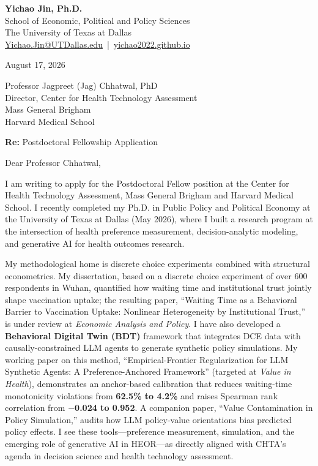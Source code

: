 \documentclass[11pt]{article}
\begin{document}
\enlargethispage{1.5\baselineskip}

\begin{flushleft}
\textbf{Yichao Jin, Ph.D.}\\
School of Economic, Political and Policy Sciences\\
The University of Texas at Dallas\\
\href{mailto:Yichao.Jin@UTDallas.edu}{Yichao.Jin@UTDallas.edu} \,|\, \href{https://yichao2022.github.io}{yichao2022.github.io}
\end{flushleft}

\vspace{14pt}

August 17, 2026

\vspace{14pt}

Professor Jagpreet (Jag) Chhatwal, PhD\\
Director, Center for Health Technology Assessment\\
Mass General Brigham\\
Harvard Medical School

\vspace{14pt}

\textbf{Re:} Postdoctoral Fellowship Application

\vspace{14pt}

Dear Professor Chhatwal,

I am writing to apply for the Postdoctoral Fellow position at the Center for Health Technology Assessment, Mass General Brigham and Harvard Medical School. I recently completed my Ph.D. in Public Policy and Political Economy at the University of Texas at Dallas (May 2026), where I built a research program at the intersection of health preference measurement, decision-analytic modeling, and generative AI for health outcomes research.

My methodological home is discrete choice experiments combined with structural econometrics. My dissertation, based on a discrete choice experiment of over 600 respondents in Wuhan, quantified how waiting time and institutional trust jointly shape vaccination uptake; the resulting paper, ``Waiting Time as a Behavioral Barrier to Vaccination Uptake: Nonlinear Heterogeneity by Institutional Trust,'' is under review at \textit{Economic Analysis and Policy}. I have also developed a \textbf{Behavioral Digital Twin (BDT)} framework that integrates DCE data with causally-constrained LLM agents to generate synthetic policy simulations. My working paper on this method, ``Empirical-Frontier Regularization for LLM Synthetic Agents: A Preference-Anchored Framework'' (targeted at \textit{Value in Health}), demonstrates an anchor-based calibration that reduces waiting-time monotonicity violations from \textbf{62.5\% to 4.2\%} and raises Spearman rank correlation from \textbf{$-$0.024 to 0.952}. A companion paper, ``Value Contamination in Policy Simulation,'' audits how LLM policy-value orientations bias predicted policy effects. I see these tools---preference measurement, simulation, and the emerging role of generative AI in HEOR---as directly aligned with CHTA's agenda in decision science and health technology assessment.
\end{document}
